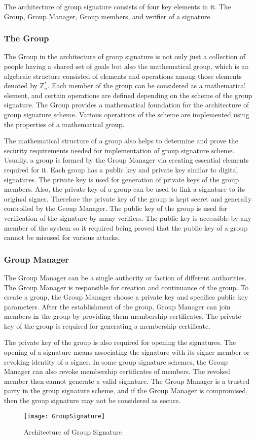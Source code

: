 The architecture of group signature consists of four key elements in it. The Group, Group Manager, Group members, and verifier of a signature.
\subsubsection{The Group}
The Group in the architecture of group signature is not only just a collection of people having a shared set of goals but also the mathematical group, which is an algebraic structure consisted of elements and operations among those elements denoted by $\mathbb{Z}^*_n$. Each member of the group can be considered as a mathematical element, and certain operations are defined depending on the scheme of the group signature. The Group provides a mathematical foundation for the architecture of group signature scheme. Various operations of the scheme are implemented using the properties of a mathematical group. 

The mathematical structure of a group also helps to determine and prove the security requirements needed for implementation of group signature scheme. Usually, a group is formed by the Group Manager via creating essential elements required for it. Each group has a public key and private key similar to digital signatures. The private key is used for generation of private keys of the group members. Also, the private key of a group can be used to link a signature to its original signer. Therefore the private key of the group is kept secret and generally controlled by the Group Manager. The public key of the group is used for verification of the signature by many verifiers. The public key is accessible by any member of the system so it required being proved that the public key of a group cannot be misused for various attacks.
\subsubsection{Group Manager}
The Group Manager can be a single authority or faction of different authorities. The Group Manager is responsible for creation and continuance of the group. To create a group, the Group Manager choose a private key and specifies public key parameters. After the establishment of the group, Group Manager can join members in the group by providing them membership certificates. The private key of the group is required for generating a membership certificate. 

The private key of the group is also required for opening the signatures. The opening of a signature means associating the signature with its signer member or revoking identity of a signer. In some group signature schemes, the Group Manager can also revoke membership certificates of members. The revoked member then cannot generate a valid signature. The Group Manager is a trusted party in the group signature scheme, and if the Group Manager is compromised, then the group signature may not be considered as secure.
\begin{figure}[h]
    \centering
    \texttt{[image: GroupSignature]}
    \caption{Architecture of Group Signature }
    \label{fig:GroupSignature}
\end{figure}
